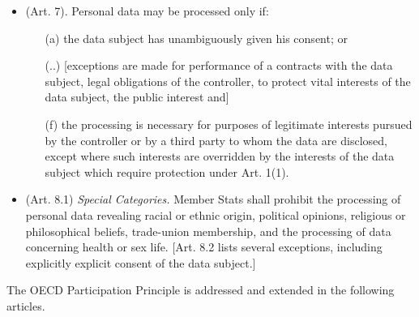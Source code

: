 \begin{itemize}
\item (Art. 7). Personal data may be processed only if:
  \begin{itemize}
    \item [(a)] the data subject has unambiguously given his consent; or
    \item [(..)] [exceptions are made for performance of a contracts with the data subject,  legal obligations of the controller, to protect vital interests of the data subject, the public interest and]
     \item [(f)] the processing is necessary for purposes of legitimate interests pursued by the controller or by a third party to whom the data are disclosed, except where such interests are overridden by the interests \om of the data subject which require protection under Art. 1(1).
  \end{itemize}

\item (Art. 8.1) \emph{Special Categories.} Member Stats shall prohibit the processing of personal data revealing racial or ethnic origin, political opinions, religious or philosophical beliefs, trade-union membership, and the processing of data concerning health or sex life. [Art. 8.2 lists several exceptions, including explicitly explicit consent of the data subject.]
\end{itemize}

The OECD Participation Principle is addressed and extended in the following articles.

